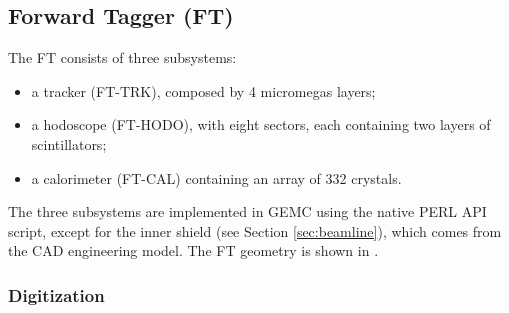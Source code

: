 \subsection{Forward Tagger (FT)}

The FT consists of three subsystems:

\begin{itemize}
	\item a tracker (FT-TRK), composed by 4 micromegas layers;
	\item a hodoscope (FT-HODO), with eight sectors, each containing two layers of scintillators;
 	\item a calorimeter (FT-CAL) containing an array of 332 crystals.
\end{itemize}

The three subsystems are implemented in GEMC using the native PERL API script, except for the inner shield (see Section \ref{sec:beamline}),
which comes from the CAD engineering model.
The FT geometry is shown in .

\subsubsection{Digitization}

